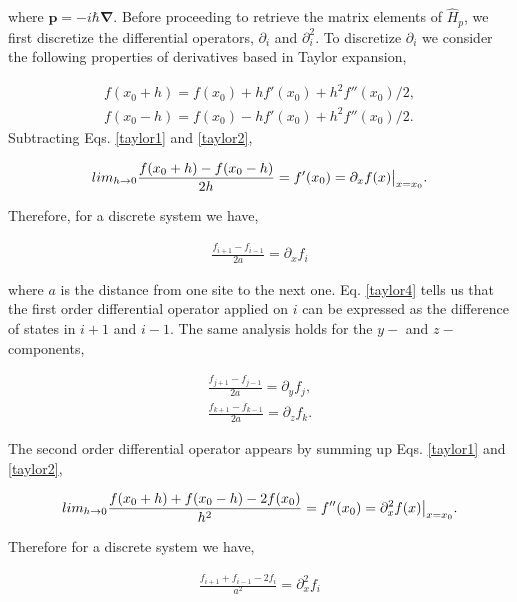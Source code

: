 \documentclass[10pt,prb,showpacs,amssymb,floatfix]{revtex4-1}
\begin{document}
where $\bm p = -i\hbar\bm \nabla$. Before proceeding to retrieve the matrix elements of $\hat H_{p}$, we first discretize the differential operators, $\partial_i$ and $\partial_i^2$. To discretize $\partial_i$ we consider the following properties of derivatives based in Taylor expansion,

\begin{align}
\label{taylor1}
f(x_0 + h) = f(x_0) + h f'(x_0) + h^2 f''(x_0) / 2, \\
f(x_0 - h) = f(x_0) - h f'(x_0) + h^2 f''(x_0) / 2.
\label{taylor2}
\end{align}
Subtracting Eqs. \eqref{taylor1} and \eqref{taylor2},

\begin{align}
lim_{h\rightarrow 0}\frac{f(x_0 + h) - f(x_0 - h)}{2h} = f'(x_0) = \partial_x f(x) \big{|}_{x=x_0}.
\label{taylor3}
\end{align}

Therefore, for a discrete system we have,

\begin{align}
\frac{f_{i+1} - f_{i-1}}{2a} =  \partial_x f_i 
\label{taylor4}
\end{align}

where $a$ is the distance from one site to the next one. Eq. \eqref{taylor4} tells us that the first order differential operator applied on $i$ can be expressed as the difference of states in $i+1$ and $i-1$. The same analysis holds for the $y-$ and $z-$ components,

\begin{align}
\frac{f_{j+1} - f_{j-1}}{2a} =  \partial_y f_j, \\
\frac{f_{k+1} - f_{k-1}}{2a} =  \partial_z f_k. 
\label{taylor5}
\end{align}

The second order differential operator appears by summing up Eqs. \eqref{taylor1} and \eqref{taylor2},

\begin{align}
lim_{h\rightarrow 0}\frac{f(x_0 + h) +  f(x_0 - h) - 2f(x_0)}{h^2} = f''(x_0) = \partial^2_x f(x) \big{|}_{x=x_0}.
\label{taylor6}
\end{align}

Therefore for a discrete system we have,

\begin{align}
\frac{f_{i+1} + f_{i-1} - 2f_i}{a^2} =  \partial^2_x f_i 
\label{taylor7}
\end{align}
\end{document}
